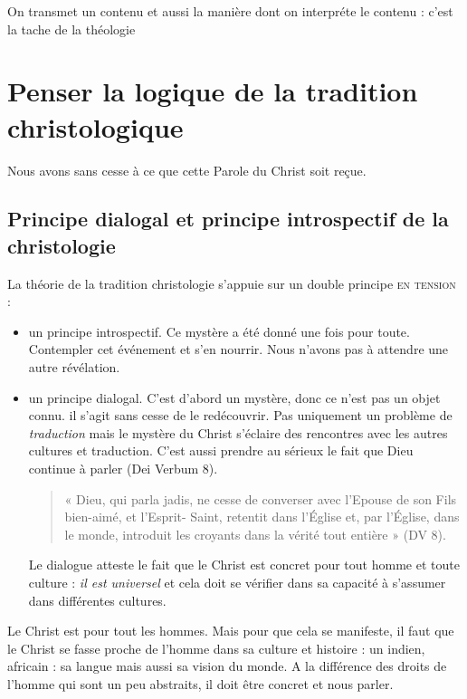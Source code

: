     \begin{Synthesis}
    On transmet un contenu et aussi la manière dont on interpréte le contenu : c'est la tache de la théologie
    \end{Synthesis}
    
  \section{Penser la logique de la tradition
  christologique}

  Nous avons sans cesse à ce que cette Parole du Christ soit reçue. 
  
  
  
    
    \subsection{Principe dialogal et principe introspectif de la christologie}
    
  La théorie de la tradition christologie s'appuie sur un double principe \textsc{en tension} : 
  \begin{itemize}
     
      \item un principe introspectif.   Ce mystère a été donné une fois pour toute. Contempler cet événement et s'en nourrir. Nous n'avons pas à attendre une autre révélation.
       \item un principe dialogal. C'est d'abord un mystère, donc ce n'est pas un objet connu. il s'agit sans cesse de le redécouvrir. Pas uniquement un problème de \textit{traduction} mais le mystère du Christ s'éclaire des rencontres avec les autres cultures et traduction. C'est aussi prendre au sérieux le fait que Dieu continue à parler (Dei Verbum 8).
       \begin{quote}
    « Dieu, qui parla jadis, ne cesse de converser avec l'Epouse de son Fils
bien-aimé, et l'Esprit- Saint, retentit dans l'Église et, par l'Église,
dans le monde, introduit les croyants dans la vérité tout entière » (DV
8).
\end{quote}
Le dialogue atteste le fait que le Christ est concret pour tout homme et toute culture : \textit{il est universel} et cela doit se vérifier dans sa capacité à s'assumer dans différentes cultures. 
  \end{itemize}

\begin{Synthesis}
Le Christ est pour tout les hommes. Mais pour que cela se manifeste, il faut que le Christ se fasse proche de l'homme dans sa culture et histoire : un indien, africain : sa langue mais aussi sa vision du monde. A la différence des droits de l'homme qui sont un peu abstraits, il doit être concret et nous parler.
\end{Synthesis}
    

